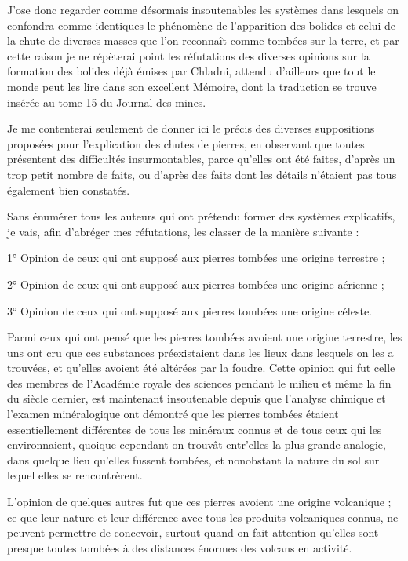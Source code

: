\documentclass[a4paper, 12pt, oneside, french]{article}
\begin{document}
J'ose donc regarder comme désormais insoutenables les systèmes dans lesquels on confondra comme identiques le phénomène de l'apparition des bolides et celui de la chute de diverses masses que l'on reconnaît comme tombées sur la terre, et par cette raison je ne répèterai point les réfutations des diverses opinions sur la formation des bolides déjà émises par Chladni, attendu d'ailleurs que tout le monde peut les lire dans son excellent Mémoire, dont la traduction se trouve insérée au tome 15 du Journal des mines.

Je me contenterai seulement de donner ici le précis des diverses suppositions proposées pour l'explication des chutes de pierres, en observant que toutes présentent des difficultés insurmontables, parce qu'elles ont été faites, d'après un trop petit nombre de faits, ou d'après des faits dont les détails n'étaient pas tous également bien constatés.

Sans énumérer tous les auteurs qui ont prétendu former des systèmes explicatifs, je vais, afin d'abréger mes réfutations, les classer de la manière suivante :

1° Opinion de ceux qui ont supposé aux pierres tombées une origine terrestre ;

2° Opinion de ceux qui ont supposé aux pierres tombées une origine aérienne ;

3° Opinion de ceux qui ont supposé aux pierres tombées une origine céleste.

Parmi ceux qui ont pensé que les pierres tombées avoient une origine terrestre, les uns ont cru que ces substances préexistaient dans les lieux dans lesquels on les a trouvées, et qu'elles avoient été altérées par la foudre. Cette opinion qui fut celle des membres de l'Académie royale des sciences pendant le milieu et même la fin du siècle dernier, est maintenant insoutenable depuis que l'analyse chimique et l'examen minéralogique ont démontré que les pierres tombées étaient essentiellement différentes de tous les minéraux connus et de tous ceux qui les environnaient, quoique cependant on trouvât entr'elles la plus grande analogie, dans quelque lieu qu'elles fussent tombées, et nonobstant la nature du sol sur lequel elles se rencontrèrent.

L'opinion de quelques autres fut que ces pierres avoient une origine volcanique ; ce que leur nature et leur différence avec tous les produits volcaniques connus, ne peuvent permettre de concevoir, surtout quand on fait attention qu'elles sont presque toutes tombées à des distances énormes des volcans en activité.
\end{document}
